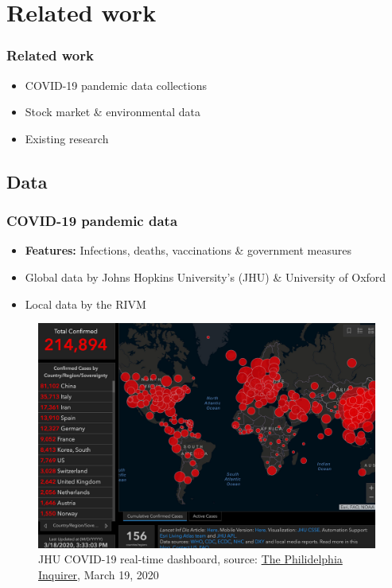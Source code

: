 \documentclass[aspectratio=169,classic]{uva-inf-presentation}
\begin{document}
\section{Related work}
\begin{frame}
\frametitle{Related work}
\begin{itemize}
    \item COVID-19 pandemic data collections
    \item Stock market \& environmental data 
    \item Existing research
\end{itemize}
\end{frame}

\twocolumn



\subsection{Data}
\begin{frame}
\frametitle{COVID-19 pandemic data}
\begin{itemize}
    \item \textbf{Features:} Infections, deaths, vaccinations \& government measures
    \item Global data by Johns Hopkins University's (JHU) \cite{dong2020interactive} \& University of Oxford \cite{hale2020variation}
    \item Local data by the RIVM
\end{itemize}
\begin{figure}\centering
    \includegraphics[trim=0cm 0cm 0 -5.5cm, scale=0.3]{images/jhu_samples.jpg}
    \caption{JHU COVID-19 real-time dashboard, source: \href{run:https://www.inquirer.com/health/coronavirus/coronavirus-johns-hopkins-map-world-cases-20200319.html}{The Philidelphia Inquirer}, March 19, 2020}
\end{figure}
\end{frame}
\end{document}
